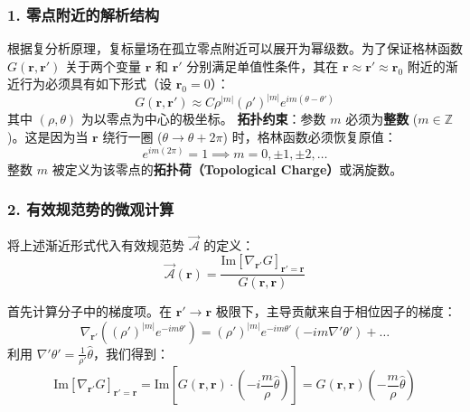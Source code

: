 \documentclass[a4paper,12pt]{article}
\begin{document}
\subsubsection{1. 零点附近的解析结构}

根据复分析原理，复标量场在孤立零点附近可以展开为幂级数。为了保证格林函数 $G(\mathbf{r}, \mathbf{r}')$ 关于两个变量 $\mathbf{r}$ 和 $\mathbf{r}'$ 分别满足单值性条件，其在 $\mathbf{r} \approx \mathbf{r}' \approx \mathbf{r}_0$ 附近的渐近行为必须具有如下形式（设 $\mathbf{r}_0=0$）：
\begin{equation}
    G(\mathbf{r}, \mathbf{r}') \approx C \rho^{|m|} (\rho')^{|m|} e^{im(\theta - \theta')}
\end{equation}
其中 $(\rho, \theta)$ 为以零点为中心的极坐标。
\textbf{拓扑约束}：参数 $m$ 必须为\textbf{整数} ($m \in \mathbb{Z}$)。这是因为当 $\mathbf{r}$ 绕行一圈 ($\theta \to \theta + 2\pi$) 时，格林函数必须恢复原值：
\begin{equation}
    e^{im(2\pi)} = 1 \implies m = 0, \pm 1, \pm 2, \dots
\end{equation}
整数 $m$ 被定义为该零点的\textbf{拓扑荷（Topological Charge）}或涡旋数。

\subsubsection{2. 有效规范势的微观计算}

将上述渐近形式代入有效规范势 $\vec{\mathcal{A}}$ 的定义：
\begin{equation}
    \vec{\mathcal{A}}(\mathbf{r}) = \frac{\text{Im}[\nabla_{\mathbf{r}'} G]_{\mathbf{r}'=\mathbf{r}}}{G(\mathbf{r}, \mathbf{r})}
\end{equation}

首先计算分子中的梯度项。在 $\mathbf{r}' \to \mathbf{r}$ 极限下，主导贡献来自于相位因子的梯度：
\begin{equation}
    \nabla_{\mathbf{r}'} \left( (\rho')^{|m|} e^{-im\theta'} \right) = (\rho')^{|m|} e^{-im\theta'} \left( -im \nabla' \theta' \right) + \dots
\end{equation}
利用 $\nabla' \theta' = \frac{1}{\rho'} \hat{\theta}$，我们得到：
\begin{equation}
    \text{Im}[\nabla_{\mathbf{r}'} G]_{\mathbf{r}'=\mathbf{r}} = \text{Im}\left[ G(\mathbf{r}, \mathbf{r}) \cdot \left( -i \frac{m}{\rho} \hat{\theta} \right) \right] = G(\mathbf{r}, \mathbf{r}) \left( -\frac{m}{\rho} \hat{\theta} \right)
\end{equation}
\end{document}
